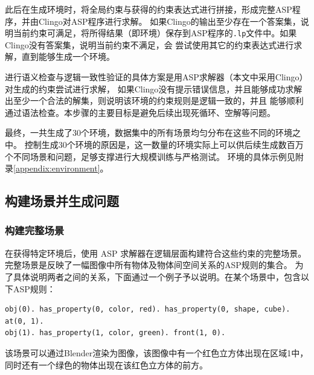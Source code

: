 此后在生成环境时，将全局约束与获得的约束表达式进行拼接，形成完整ASP程序，并由Clingo对ASP程序进行求解。
如果Clingo的输出至少存在一个答案集，说明当前约束可满足，将所得结果（即环境）保存到ASP程序的\texttt{.lp}文件中。如果Clingo没有答案集，说明当前约束不满足，会
尝试使用其它的约束表达式进行求解，直到能够生成一个环境。

进行语义检查与逻辑一致性验证的具体方案是用ASP求解器（本文中采用Clingo）对生成的约束尝试进行求解，
如果Clingo没有提示错误信息，并且能够成功求解出至少一个合法的解集，则说明该环境的约束规则是逻辑一致的，并且
能够顺利通过语法检查。本步骤的主要目标是避免后续出现死循环、空解等问题。

最终，一共生成了30个环境，数据集中的所有场景均匀分布在这些不同的环境之中。
控制生成30个环境的原因是，这一数量的环境实际上可以供后续生成数百万个不同场景和问题，足够支撑进行大规模训练与严格测试。
环境的具体示例见附录\ref{appendix:environment}。
\subsection{构建场景并生成问题}
\subsubsection{构建完整场景}
在获得特定环境后，使用 ASP 求解器在逻辑层面构建符合这些约束的完整场景。
完整场景是反映了一幅图像中所有物体及物体间空间关系的ASP规则的集合。
为了具体说明两者之间的关系，下面通过一个例子予以说明。在某个场景中，包含以下ASP规则：
\begin{lstlisting}
obj(0). has_property(0, color, red). has_property(0, shape, cube). at(0, 1).
obj(1). has_property(1, color, green). front(1, 0).
\end{lstlisting}
该场景可以通过Blender渲染为图像，该图像中有一个红色立方体出现在区域1中，
同时还有一个绿色的物体出现在该红色立方体的前方。

